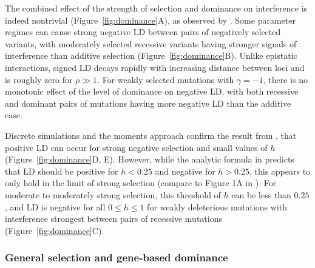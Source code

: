 \documentclass[]{article}
\begin{document}
The combined effect of the strength of selection and dominance on interference
is indeed nontrivial (Figure~\ref{fig:dominance}A), as observed by
\citet{Garcia2021-zn}. Some parameter regimes can cause strong negative LD
between pairs of negatively selected variants, with moderately selected
recessive variants having stronger signals of interference than additive
selection (Figure~\ref{fig:dominance}B). Unlike epistatic interactions, signed
LD decays rapidly with increasing distance between loci and is roughly zero for
\(\rho \gg 1\). For weakly selected mutations with \(\gamma=-1\), there is no
monotonic effect of the level of dominance on negative LD, with both recessive
and dominant pairs of mutations having more negative LD than the additive case.

Discrete simulations and the moments approach confirm the result from
\citet{Roze2021-cf}, that positive LD can occur for strong negative selection
and small values of \(h\) (Figure~\ref{fig:dominance}D, E). However, while the
analytic formula in \citet{Roze2021-cf} predicts that LD should be positive for
\(h<0.25\) and negative for \(h>0.25\), this appears to only hold in the limit
of strong selection (compare to Figure 1A in \citet{Roze2021-cf}). For moderate
to moderately strong selection, this threshold of \(h\) can be less than
\(0.25\), and LD is negative for all \(0\leq h \leq 1\) for weakly deleterious
mutations with interference strongest between pairs of recessive mutations
(Figure~\ref{fig:dominance}C).

\subsubsection{General selection and gene-based dominance}
\label{sec:general-selection}
\end{document}
